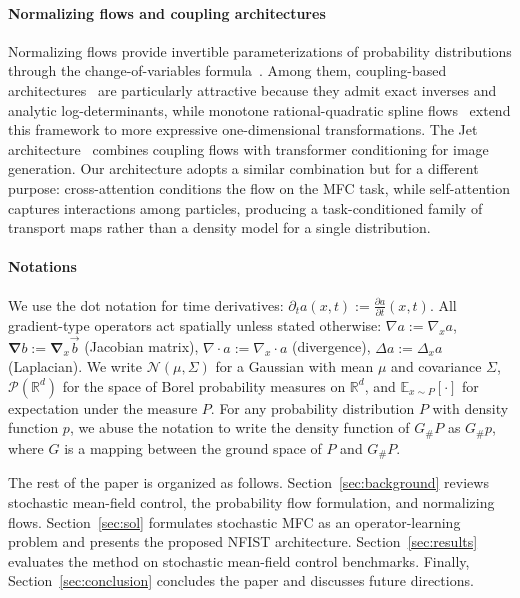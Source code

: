\documentclass[preprint]{elsarticle}
\newcommand{\R}{\mathbb{R}}
\newcommand{\E}{\mathbb{E}}
\newcommand{\pr}{\mathscr{P}}           %
\newcommand{\m}{\mu}
\newcommand{\Sig}{\Sigma}               %
\newcommand{\sN}{\mathcal{N}}
\begin{document}
\paragraph{Normalizing flows and coupling architectures}
Normalizing flows provide invertible parameterizations of probability distributions through the change-of-variables formula~\cite{rezende2015flow,papamakarios2021nf,Kobyzev2021}. Among them, coupling-based architectures~\cite{dinh2014nice,dinh2017realnvp} are particularly attractive because they admit exact inverses and analytic log-determinants, while monotone rational-quadratic spline flows~\cite{durkan2019nsf} extend this framework to more expressive one-dimensional transformations. The Jet architecture~\cite{kolesnikov2024jet} combines coupling flows with transformer conditioning for image generation. Our architecture adopts a similar combination but for a different purpose: cross-attention conditions the flow on the MFC task, while self-attention captures interactions among particles, producing a task-conditioned family of transport maps rather than a density model for a single distribution.


\paragraph{Notations}\label{sec:notation}

We use the dot notation for time derivatives: $\partial_t a(x,t) := \frac{\partial a}{\partial t}(x,t)$. All gradient-type operators act spatially unless stated otherwise: $\nabla a := \nabla_x a$,  $\boldsymbol{\nabla} b := \boldsymbol{\nabla}_x\vec b$ (Jacobian matrix), $\nabla\cdot a := \nabla_x\cdot a$ (divergence), $\Delta a := \Delta_x a$ (Laplacian). We write $\sN(\m,\Sig)$ for a Gaussian with mean $\m$ and covariance $\Sig$, $\pr(\R^d)$ for the space of Borel probability measures on $\R^d$, and $\E_{x\sim P}[\cdot]$ for expectation under the measure $P$. For any probability distribution $P$ with density function $p$, we abuse the notation to write the density function of $G_\# P$ as $G_\# p$, where $G$ is a mapping between the ground space of $P$ and $G_\# P$. 

The rest of the paper is organized as follows. Section~\ref{sec:background} reviews stochastic mean-field control, the probability flow formulation, and normalizing flows. Section~\ref{sec:sol} formulates stochastic MFC as an operator-learning problem and presents the proposed NFIST architecture. Section~\ref{sec:results} evaluates the method on stochastic mean-field control benchmarks. Finally, Section~\ref{sec:conclusion} concludes the paper and discusses future directions.
\end{document}
